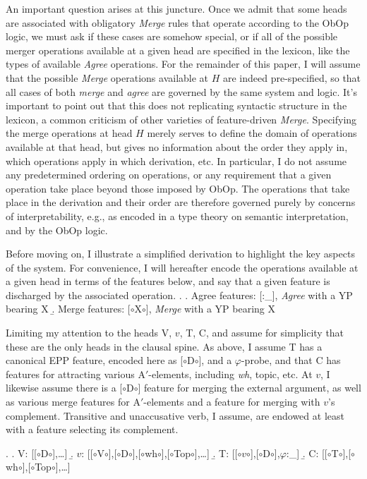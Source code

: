 \documentclass[11pt, letterpaper]{paper_nick}
\newcommand{\fm}[1]{[$\circ$#1$\circ$]}
\begin{document}

An important question arises at this juncture. Once we admit that some heads are associated with obligatory \emph{Merge} rules that operate according to the ObOp logic, we must ask if these cases are somehow special, or if all of the possible merger operations available at a given head are specified in the lexicon, like the types of available \emph{Agree} operations. For the remainder of this paper, I will assume that the possible \emph{Merge} operations available at $H$ are indeed pre-specified, so that all cases of both \emph{merge} and \emph{agree} are governed by the same system and logic. It's important to point out that this does not replicating syntactic structure in the lexicon, a common criticism of other varieties of feature-driven \emph{Merge}. Specifying the merge operations at head $H$ merely serves to define the domain of operations available at that head, but gives no information about the order they apply in, which operations apply in which derivation, etc. In particular, I do not assume any predetermined ordering on operations, or any requirement that a given operation take place beyond those imposed by ObOp. The operations that take place in the derivation and their order are therefore governed purely by concerns of interpretability, e.g., as encoded in a type theory on semantic interpretation, and by the ObOp logic. 

Before moving on, I illustrate a simplified derivation to highlight the key aspects of the system. For convenience, I will hereafter encode the operations available at a given head in terms of the features below, and say that a given feature is discharged by the associated operation. 
\ex. \a. Agree features: [:\_], \emph{Agree} with a YP bearing X
\b. Merge features: \fm{X}, \emph{Merge} with a YP bearing X

Limiting my attention to the heads V, $v$, T, C, and assume for simplicity that these are the only heads in the clausal spine. As above, I assume T has a canonical EPP feature, encoded here as \fm{D}, and a $\varphi$-probe, and that C has features for attracting various A$'$-elements, including \emph{wh}, topic, etc. At $v$, I likewise assume there is a \fm{D} feature for merging the external argument, as well as various merge features for A$'$-elements and a feature for merging with $v$'s complement. Transitive and unaccusative verb, I assume, are endowed at least with a feature selecting its complement. 
\begin{multicols}{2} 
\ex. \a. V: [\fm{D},\ldots]
\b. $v$: [\fm{V},\fm{D},\fm{wh},\fm{Top},\ldots]
\b. T: [\fm{$v$},\fm{D},$\varphi$:\_]
\b. C: [\fm{T},\fm{wh},\fm{Top},\ldots]
\end{multicols}
\end{document}

